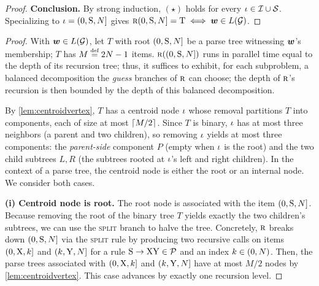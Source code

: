 \documentclass{article}
\begin{document}
\begin{proof}
    \textbf{Conclusion.} By strong induction, $(\star)$ holds for every ${{ \iota}} \in {{\mathcal{I}}} \cup {{\mathcal{S}}}$. Specializing to ${{ \iota}} = (0, {{ \mathrm{S}}}, {{ N}}]$ gives ${\textsc{r}}(0, {{ \mathrm{S}}}, {{ N}}] = {\mathbin{\mathrm{T}}} \iff {{\boldsymbol{w}}} \in {L}({{ \mathcal{G}}})$.
\end{proof}

\solvelognsteps*
\begin{proof}
    With ${{\boldsymbol{w}}} \in {L}({{ \mathcal{G}}})$, let $T$ with root $(0, {{ \mathrm{S}}}, {{ N}}]$ be a parse tree witnessing ${{\boldsymbol{w}}}$'s membership; $T$ has $M \defeq 2\idxn - 1$ items.
    ${\textsc{r}}((0,{{ \mathrm{S}}},{{ N}}])$ runs in parallel time equal to the depth of its recursion tree; thus, it suffices to exhibit, for each subproblem, a balanced decomposition the \emph{guess} branches of ${\textsc{r}}$ can choose; the depth of ${\textsc{r}}$'s recursion is then bounded by the depth of this balanced decomposition.
    
    By \cref{lem:centroidvertex}, $T$ has a centroid node ${{ \iota}}$ whose removal partitions $T$ into components, each of size at most $\lceil M/2\rceil$. Since $T$ is binary, ${{ \iota}}$ has at most three neighbors (a parent and two children), so removing ${{ \iota}}$ yields at most three components: the \emph{parent-side} component $P$ (empty when ${{ \iota}}$ is the root) and the two child subtrees $L, R$ (the subtrees rooted at ${{ \iota}}$'s left and right children).
    In the context of a parse tree, the centroid node is either the root or an internal node.
    We consider both cases.
    
    \textbf{(i) Centroid node is root.}
    The root node is associated with the item $(0, {{ \mathrm{S}}}, {{ N}}]$.
    Because removing the root of the binary tree $T$ yields exactly the two children's subtrees, we can use the \textsc{split} branch to halve the tree. 
    Concretely, ${\textsc{r}}$ breaks down $(0, {{ \mathrm{S}}}, {{ N}}]$ via the \textsc{split} rule by producing two recursive calls on items $(0, {{ \mathrm{X}}}, {{ k}}]$ and $({{ k}}, {{ \mathrm{Y}}}, {{ N}}]$ for a rule ${{ {{ \mathrm{S}}} \rightarrow {{ \mathrm{X}}} {{ \mathrm{Y}}}}} \in {{ \mathcal{P}}}$ and an index ${{ k}} \in (0,{{ N}})$.
    Then, the parse trees associated with $(0, {{ \mathrm{X}}}, {{ k}}]$ and $({{ k}}, {{ \mathrm{Y}}}, {{ N}}]$ have at most $M/2$ nodes by \cref{lem:centroidvertex}.
    This case advances by exactly one recursion level.
    

\end{proof}
\end{document}
